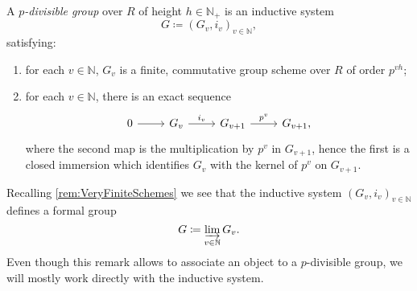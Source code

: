 \begin{defn}\label{defn:pDivGroupFormalSchemes}
	A {\em $p$-divisible group} over $R$ of height $h \in \mathbb{N}_+$ is an inductive system
	\begin{equation*}
	G \coloneqq \left(G_v, i_v\right)_{v \in \mathbb{N}}
	,\end{equation*} 
	satisfying:
	\begin{enumerate}
		\item for each $v \in \mathbb{N}$, $G_v$ is a finite, commutative group scheme over $R$
			of order $p^{v h}$;
		\item for each $v \in \mathbb{N}$, there is an exact sequence
			\begin{equation*}
			\begin{tikzcd}
				0 \arrow[r, "", rightarrow] &
				G_v \arrow[r, "i_v", rightarrow] &
				G_{v + 1} \arrow[r, "p^v", rightarrow] &
				G_{v + 1} 
			,\end{tikzcd}
			\end{equation*}
			where the second map is the multiplication by $p^v$ in $G_{v + 1}$,
			hence the first is a closed immersion which identifies
			$G_v$ with the kernel of $p^v$ on $G_{v+1}$.
	\end{enumerate}
\end{defn}


\begin{rem}[]
	Recalling \cref{rem:VeryFiniteSchemes} we see that the inductive system 
	$\left( G_v, i_v \right)_{v \in \mathbb{N}}$ defines a formal group 
	\begin{equation*}
	G \coloneqq \varinjlim_{v \in \mathbb{N}} G_v
	.\end{equation*}
	Even though this remark allows to associate an object to a $p$-divisible 
	group, we will mostly work directly with the inductive system.
\end{rem}


